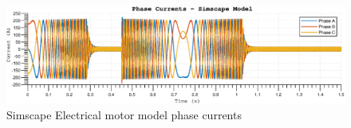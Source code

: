 \begin{figure}[htb]
\begingroup
\tikzset{}
 \centerline{\includegraphics[width=1\columnwidth]{.//Figure/EPS/pe_speedramp_currents.eps}}
 \endgroup
 \caption{Simscape Electrical motor model phase currents}
 \label{fig:pe_speedramp_current}
\end{figure}